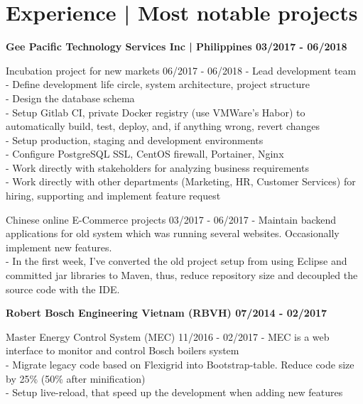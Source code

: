 \section*{Experience | \small{Most notable projects}}
{%
  \textbf{\event
    {Gee Pacific Technology Services Inc | Philippines}
    {03/2017 - 06/2018}
    {}
  }

  \event
  {Incubation project for new markets}
  {06/2017 - 06/2018}
  {
    - Lead development team \\
    - Define development life circle, system architecture, project structure\\
    - Design the database schema\\
    - Setup Gitlab CI, private Docker registry (use VMWare's Habor) to
    automatically build, test, deploy, and, if anything wrong, revert changes\\
    - Setup production, staging and development environments\\
    - Configure PostgreSQL SSL, CentOS firewall, Portainer, Nginx\\
    - Work directly with stakeholders for analyzing business requirements\\
    - Work directly with other departments (Marketing, HR, Customer Services)
    for hiring, supporting and implement feature request
  }

  \event
  {Chinese online E-Commerce projects}
  {03/2017 - 06/2017}
  {
    - Maintain backend applications for old system which was running several
    websites. Occasionally implement new features.\\
    - In the first week, I've converted the old project setup from using
    Eclipse and committed jar libraries to Maven, thus, reduce repository size
    and decoupled the source code with the IDE.
  }

  \textbf{\event
    {Robert Bosch Engineering Vietnam (RBVH)}
    {07/2014 - 02/2017}
    {}
  }

  \event
  {Master Energy Control System (MEC)}
  {11/2016 - 02/2017}
  {
    - MEC is a web interface to monitor and control Bosch boilers system\\
    - Migrate legacy code based on Flexigrid into Bootstrap-table.
    Reduce code size by 25\% (50\% after minification)\\
    - Setup live-reload,  that speed up the development when adding new
    features
  }

}
